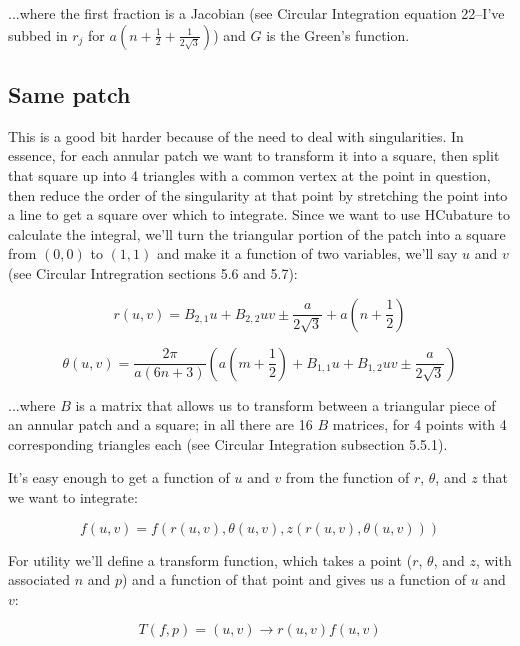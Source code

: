\documentclass[etd,oneside,senior]{BYUPhys}
\begin{document}
...where the first fraction is a Jacobian (see Circular Integration equation 22--I've subbed in $r_{j}$ for $a\left(n+\frac{1}{2}+\frac{1}{2\sqrt{3}}\right)$) and $G$ is the Green's function.

\subsection{Same patch} \label{sec:same_patch}
This is a good bit harder because of the need to deal with singularities. In essence, for each annular patch we want to transform it into a square, then split that square up into 4 triangles with a common vertex at the point in question, then reduce the order of the singularity at that point by stretching the point into a line to get a square over which to integrate. Since we want to use HCubature to calculate the integral, we'll turn the triangular portion of the patch into a square from $(0,0)$ to $(1,1)$ and make it a function of two variables, we'll say $u$ and $v$ (see Circular Intregration sections 5.6 and 5.7):

\begin{equation}
  r\left(u,v\right)=B_{2,1}u+B_{2,2}uv\pm\frac{a}{2\sqrt{3}}+a\left(n+\frac{1}{2}\right)
\end{equation}

\begin{equation}
  \theta\left(u,v\right)=\frac{2\pi}{a(6n+3)}\left(a\left(m+\frac{1}{2}\right)+B_{1,1}u+B_{1,2}uv\pm\frac{a}{2\sqrt{3}}\right)
\end{equation}

...where $B$ is a matrix that allows us to transform between a triangular
piece of an annular patch and a square; in all there are 16 $B$ matrices,
for 4 points with 4 corresponding triangles each (see Circular Integration
subsection 5.5.1).

It's easy enough to get a function of $u$ and $v$ from the function
of $r$, $\theta$, and $z$ that we want to integrate:

\begin{equation}
  f\left(u,v\right)=f\left(r\left(u,v\right),\theta\left(u,v\right),z\left(r\left(u,v\right),\theta\left(u,v\right)\right)\right)
\end{equation}

For utility we'll define a transform function, which takes a point
($r$, $\theta$, and $z$, with associated $n$ and $p$) and a function
of that point and gives us a function of $u$ and $v$:

\begin{equation}
  T\left(f,p\right)=\left(u,v\right)\rightarrow r\left(u,v\right)f\left(u,v\right)
\end{equation}
\end{document}
